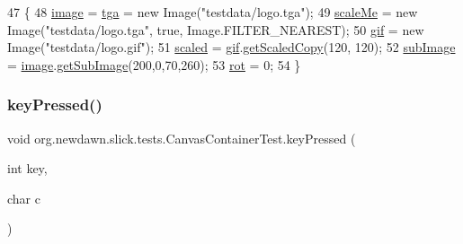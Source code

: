 \begin{DoxyCode}
47                                                                     \{
48         \mbox{\hyperlink{classorg_1_1newdawn_1_1slick_1_1tests_1_1_canvas_container_test_ab4b36d2c86487188a6813d9ea094ea78}{image}} = \mbox{\hyperlink{classorg_1_1newdawn_1_1slick_1_1tests_1_1_canvas_container_test_ae2f4c29119e720e355fa9c7f48ded3f8}{tga}} = \textcolor{keyword}{new} Image(\textcolor{stringliteral}{"testdata/logo.tga"});
49         \mbox{\hyperlink{classorg_1_1newdawn_1_1slick_1_1tests_1_1_canvas_container_test_ad3073ef57cf7775ffde0b46fa9ca451f}{scaleMe}} = \textcolor{keyword}{new} Image(\textcolor{stringliteral}{"testdata/logo.tga"}, \textcolor{keyword}{true}, Image.FILTER\_NEAREST);
50         \mbox{\hyperlink{classorg_1_1newdawn_1_1slick_1_1tests_1_1_canvas_container_test_a71f9f7b72559e875d884ee0464bfafef}{gif}} = \textcolor{keyword}{new} Image(\textcolor{stringliteral}{"testdata/logo.gif"});
51         \mbox{\hyperlink{classorg_1_1newdawn_1_1slick_1_1tests_1_1_canvas_container_test_af293aedc5147649973cd9f1235968424}{scaled}} = \mbox{\hyperlink{classorg_1_1newdawn_1_1slick_1_1tests_1_1_canvas_container_test_a71f9f7b72559e875d884ee0464bfafef}{gif}}.\mbox{\hyperlink{classorg_1_1newdawn_1_1slick_1_1_image_a833a212bc085047713ad21dc246844e9}{getScaledCopy}}(120, 120);
52         \mbox{\hyperlink{classorg_1_1newdawn_1_1slick_1_1tests_1_1_canvas_container_test_ac5ff4e8d153671ca0a92083077dcb016}{subImage}} = \mbox{\hyperlink{classorg_1_1newdawn_1_1slick_1_1tests_1_1_canvas_container_test_ab4b36d2c86487188a6813d9ea094ea78}{image}}.\mbox{\hyperlink{classorg_1_1newdawn_1_1slick_1_1_image_a2ccb3bbdda674f9efdec614a54e31e32}{getSubImage}}(200,0,70,260);
53         \mbox{\hyperlink{classorg_1_1newdawn_1_1slick_1_1tests_1_1_canvas_container_test_a330cd20f94bab9b77c601d707256dc62}{rot}} = 0;
54     \}
\end{DoxyCode}
\mbox{\label{classorg_1_1newdawn_1_1slick_1_1tests_1_1_canvas_container_test_ab781425b9ed6ef0de7301b513de25016}} 
\subsubsection{\texorpdfstring{key\+Pressed()}{keyPressed()}}
{\footnotesize\ttfamily void org.\+newdawn.\+slick.\+tests.\+Canvas\+Container\+Test.\+key\+Pressed (\begin{DoxyParamCaption}\item[{int}]{key,  }\item[{char}]{c }\end{DoxyParamCaption})\hspace{0.3cm}{\ttfamily [inline]}}

